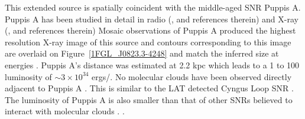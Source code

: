 \documentclass[12pt,preprint]{aastex}
\newcommand{\gev}{\text{GeV}\xspace}
\newcommand{\s}{\text{s}\xspace}
\newcommand{\rosat}{\text{{\em ROSAT}}\xspace}
\newcommand{\hl}[1]{#1}
\begin{document}
\hl{
This extended source is spatially coincident with the
middle-aged SNR Puppis A.  Puppis A has been studied in detail
in radio (\cite{puppis_a_vla}, and references therein) and  X-ray
(\cite{rosat_puppis_a,suzaku_puppis_a}, and references therein) Mosaic
\rosat observations of Puppis A produced the highest resolution X-ray
image of this source and contours corresponding to this image are
overlaid on Figure~\ref{1FGL_J0823.3-4248} and match the inferred
size at \gev energies \citep{rosat_puppis_a}.  Puppis A's distance
was estimated at 2.2 kpc \citep{reynoso_1995,reynoso_2003} which leads
to a 1 \gev to 100 \gev luminosity of $\sim 3\times 10^{34}$ ergs/\s.
No molecular clouds have been observed directly adjacent to Puppis A
\citep{co_eastern_puppis_a}.  This is similar to the LAT detected Cyngus
Loop SNR \citep{cygnus_loop_lat}.  The luminosity of Puppis A is also
smaller than that of other SNRs believed to interact with molecular clouds
\citep{w51c,ic443,w44,w28,w49b_lat}.
\citep{cygnus_loop_lat}.
}


%
    
\end{document}
